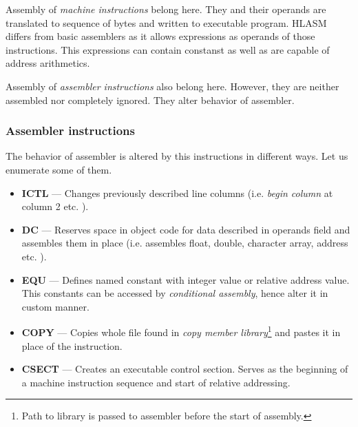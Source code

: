 Assembly of \textit{machine instructions} belong here. They and their operands are translated to sequence of bytes and written to executable program. HL\-ASM differs from basic assemblers as it allows expressions as operands of those instructions. This expressions can contain constanst as well as are capable of address arithmetics.

Assembly of \textit{assembler instructions} also belong here. However, they are neither assembled nor completely ignored. They alter behavior of assembler.

\subsubsection{Assembler instructions}
The behavior of assembler is altered by this instructions in different ways. Let us enumerate some of them.
 
\begin{itemize}
	\item \textbf{ICTL} --- Changes previously described line columns (i.e. \textit{begin column} at column 2 etc. ).
	
	\item \textbf{DC} --- Reserves space in object code for data described in operands field and assembles them in place (i.e. assembles float, double, character array, address etc. ).
	
	\item \textbf{EQU} --- Defines named constant with integer value or relative address value. This constants can be accessed by \textit{conditional assembly}, hence alter it in custom manner.
	
	\item \textbf{COPY} --- Copies whole file found in \textit{copy member library}\footnote{Path to library is passed to assembler before the start of assembly.} and pastes it in place of the instruction.
	
	\item \textbf{CSECT} --- Creates an executable control section. Serves as the beginning of a machine instruction sequence and start of relative addressing.
\end{itemize}

